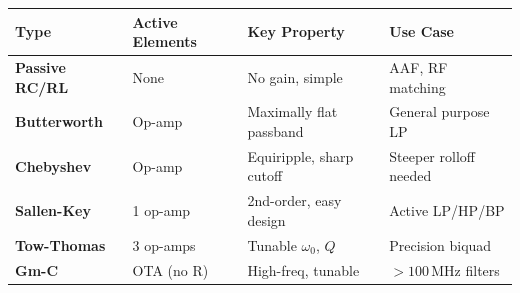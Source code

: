 \documentclass[12pt,a4paper]{article}
\renewcommand{\arraystretch}{1.45}
\begin{document}
\begin{tcolorbox}[tikzbox, title={\textbf{Analog Filter Topology Comparison}}]
\centering
\par\noindent
\renewcommand{\arraystretch}{1.3}
\begin{tabularx}{\linewidth}{|B{2.6cm}|Y|Y|Y|}
\hline
\textbf{Type} & \textbf{Active Elements} & \textbf{Key Property} & \textbf{Use Case} \\ \hline
\textbf{Passive RC/RL} & None & No gain, simple & AAF, RF matching \\ \hline
\textbf{Butterworth} & Op-amp & Maximally flat passband & General purpose LP \\ \hline
\textbf{Chebyshev} & Op-amp & Equiripple, sharp cutoff & Steeper rolloff needed \\ \hline
\textbf{Sallen-Key} & 1 op-amp & 2nd-order, easy design & Active LP/HP/BP \\ \hline
\textbf{Tow-Thomas} & 3 op-amps & Tunable $\omega_0$, $Q$ & Precision biquad \\ \hline
\textbf{Gm-C} & OTA (no R) & High-freq, tunable & $>100\,$MHz filters \\ \hline
\end{tabularx}
\end{tcolorbox}
\end{document}
